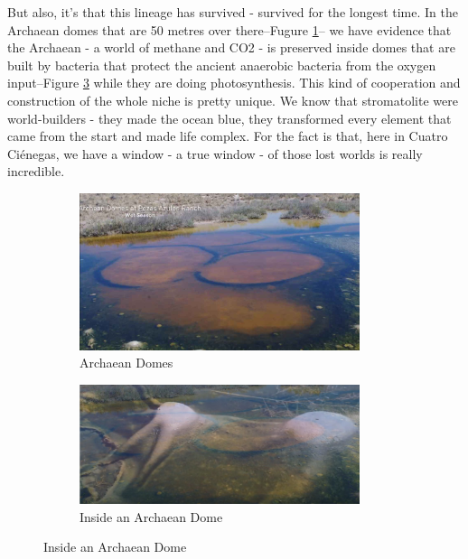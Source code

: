 \documentclass[]{article}
\begin{document}
But also, it's that this lineage has survived - survived for the longest time. In the Archaean domes that are 50 metres over there--Fugure \ref{fig:PozasAzulesDomes}-- we have evidence that the Archaean - a world of methane and CO2 - is preserved inside domes that are built by bacteria that protect the ancient anaerobic bacteria from the oxygen input--Figure \ref{fig:PozasAzulesDomeInside} while they are doing photosynthesis. This kind of cooperation and construction of the whole niche is pretty unique. We know that stromatolite were world-builders - they made the ocean blue, they transformed every element that came from the start and made life complex. For the fact is that, here in Cuatro  Ci\'enegas, we have a window - a true window - of those lost worlds is really incredible.
\begin{figure}[H]
	\caption{In the Archaean domes that are 50 metres over there} 
	\begin{subfigure}[t]{0.45\textwidth}
		\caption{Archaean Domes}\label{fig:PozasAzulesDomes}
		\includegraphics[width=0.9\textwidth]{PozasAzulesDomes}
	\end{subfigure}
	\begin{subfigure}[t]{0.45\textwidth}
		\caption{Inside an Archaean Dome}\label{fig:PozasAzulesDomeInside}
		\includegraphics[width=0.9\textwidth]{CuatroCienegas10}
	\end{subfigure}
\end{figure}
\end{document}
